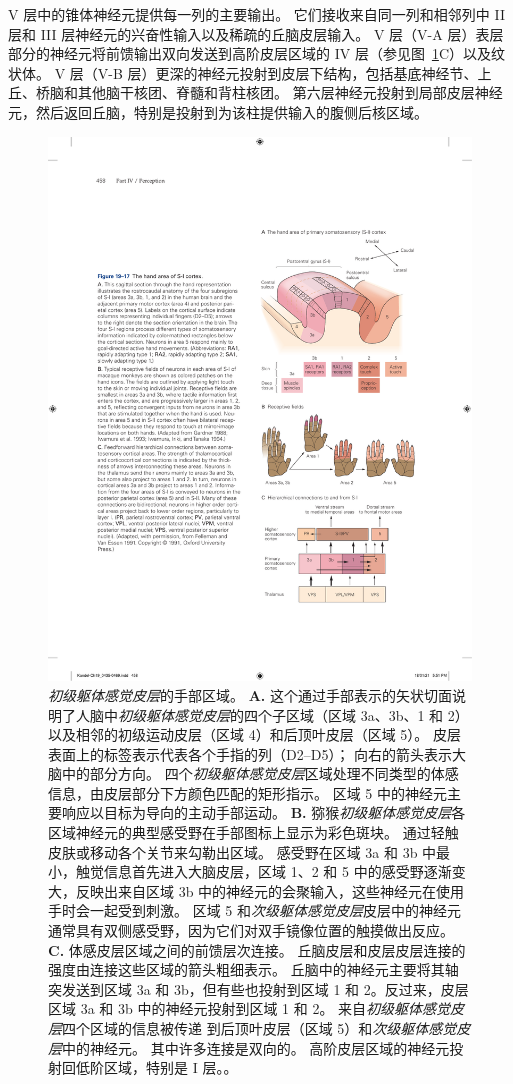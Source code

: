V 层中的锥体神经元提供每一列的主要输出。
它们接收来自同一列和相邻列中 II 层和 III 层神经元的兴奋性输入以及稀疏的丘脑皮层输入。
V 层（V-A 层）表层部分的神经元将前馈输出双向发送到高阶皮层区域的 IV 层（参见图~\ref{fig:19_17}C）以及纹状体。
V 层（V-B 层）更深的神经元投射到皮层下结构，包括基底神经节、上丘、桥脑和其他脑干核团、脊髓和背柱核团。
第六层神经元投射到局部皮层神经元，然后返回丘脑，特别是投射到为该柱提供输入的腹侧后核区域。


\begin{figure}[htbp]
	\centering
	\includegraphics[width=0.5\linewidth]{chap19/fig_19_17}
	\caption{\textit{初级躯体感觉皮层}的手部区域。 
		\textbf{A.} 这个通过手部表示的矢状切面说明了人脑中\textit{初级躯体感觉皮层}的四个子区域（区域 3a、3b、1 和 2）以及相邻的初级运动皮层（区域 4）和后顶叶皮层（区域 5）。
		皮层表面上的标签表示代表各个手指的列（D2–D5）；
		向右的箭头表示大脑中的部分方向。
		四个\textit{初级躯体感觉皮层}区域处理不同类型的体感信息，由皮层部分下方颜色匹配的矩形指示。
		区域 5 中的神经元主要响应以目标为导向的主动手部运动。
		\textbf{B.} 猕猴\textit{初级躯体感觉皮层}各区域神经元的典型感受野在手部图标上显示为彩色斑块。
		通过轻触皮肤或移动各个关节来勾勒出区域。
		感受野在区域 3a 和 3b 中最小，触觉信息首先进入大脑皮层，区域 1、2 和 5 中的感受野逐渐变大，反映出来自区域 3b 中的神经元的会聚输入，这些神经元在使用手时会一起受到刺激。
		区域 5 和\textit{次级躯体感觉皮层}皮层中的神经元通常具有双侧感受野，因为它们对双手镜像位置的触摸做出反应\cite{gardner1988somatosensory,iwamura1993rostrocaudal,iwamura1994bilateral}。
		\textbf{C.} 体感皮层区域之间的前馈层次连接。
		丘脑皮层和皮层皮层连接的强度由连接这些区域的箭头粗细表示。
		丘脑中的神经元主要将其轴突发送到区域 3a 和 3b，但有些也投射到区域 1 和 2。反过来，皮层区域 3a 和 3b 中的神经元投射到区域 1 和 2。
		来自\textit{初级躯体感觉皮层}四个区域的信息被传递 到后顶叶皮层（区域 5）和\textit{次级躯体感觉皮层}中的神经元。
		其中许多连接是双向的。
		高阶皮层区域的神经元投射回低阶区域，特别是 I 层。\cite{felleman1991distributed}。}
	\label{fig:19_17}
\end{figure}


